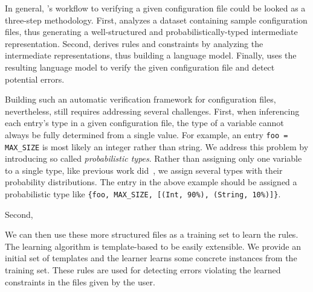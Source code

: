 In general, \app's workflow to verifying a given configuration file
could be looked as a three-step methodology.
First, \app analyzes a dataset containing sample configuration files,
thus generating a well-structured and probabilistically-typed 
intermediate representation.
Second, \app derives rules and constraints by analyzing
the intermediate representations, thus building a language model.
Finally, \app uses the resulting language model
to verify the given configuration file and detect potential errors.

Building such an automatic verification framework for
configuration files, nevertheless, still requires addressing several
challenges. 
First, when inferencing each entry's type in a given configuration file, 
the type of a variable cannot always be fully determined from a single 
value. For example, an entry {\tt foo = MAX\_SIZE} is most likely
an integer rather than string. We address this problem by introducing 
so called {\emph{probabilistic types}}.
Rather than assigning only one variable to a single type,
like previous work did~\cite{zhang14encore}, 
we assign several types with their probability distributions. 
The entry in the above example should be assigned 
a probabilistic type like 
{\tt \{foo, MAX\_SIZE, [(Int, 90\%), (String, 10\%)]\}}.

Second, 



We can then use these more structured files
as a training set to learn the rules. The learning algorithm
is template-based to be easily extensible. We provide an initial set of templates and the
learner learns some concrete instances from the training set. These
rules are used for detecting errors violating the learned constraints
in the files given by the user.


